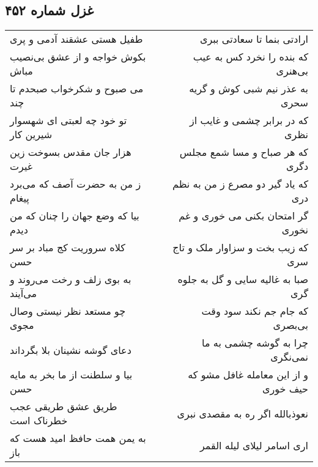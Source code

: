 \begin{center}
\section*{غزل شماره ۴۵۲}
\label{sec:sh452}
\begin{longtable}{l p{0.5cm} r}
طفیل هستی عشقند آدمی و پری
&&
ارادتی بنما تا سعادتی ببری
\\
بکوش خواجه و از عشق بی‌نصیب مباش
&&
که بنده را نخرد کس به عیب بی‌هنری
\\
می صبوح و شکرخواب صبحدم تا چند
&&
به عذر نیم شبی کوش و گریه سحری
\\
تو خود چه لعبتی ای شهسوار شیرین کار
&&
که در برابر چشمی و غایب از نظری
\\
هزار جان مقدس بسوخت زین غیرت
&&
که هر صباح و مسا شمع مجلس دگری
\\
ز من به حضرت آصف که می‌برد پیغام
&&
که یاد گیر دو مصرع ز من به نظم دری
\\
بیا که وضع جهان را چنان که من دیدم
&&
گر امتحان بکنی می خوری و غم نخوری
\\
کلاه سروریت کج مباد بر سر حسن
&&
که زیب بخت و سزاوار ملک و تاج سری
\\
به بوی زلف و رخت می‌روند و می‌آیند
&&
صبا به غالیه سایی و گل به جلوه گری
\\
چو مستعد نظر نیستی وصال مجوی
&&
که جام جم نکند سود وقت بی‌بصری
\\
دعای گوشه نشینان بلا بگرداند
&&
چرا به گوشه چشمی به ما نمی‌نگری
\\
بیا و سلطنت از ما بخر به مایه حسن
&&
و از این معامله غافل مشو که حیف خوری
\\
طریق عشق طریقی عجب خطرناک است
&&
نعوذبالله اگر ره به مقصدی نبری
\\
به یمن همت حافظ امید هست که باز
&&
اری اسامر لیلای لیله القمر
\\
\end{longtable}
\end{center}
